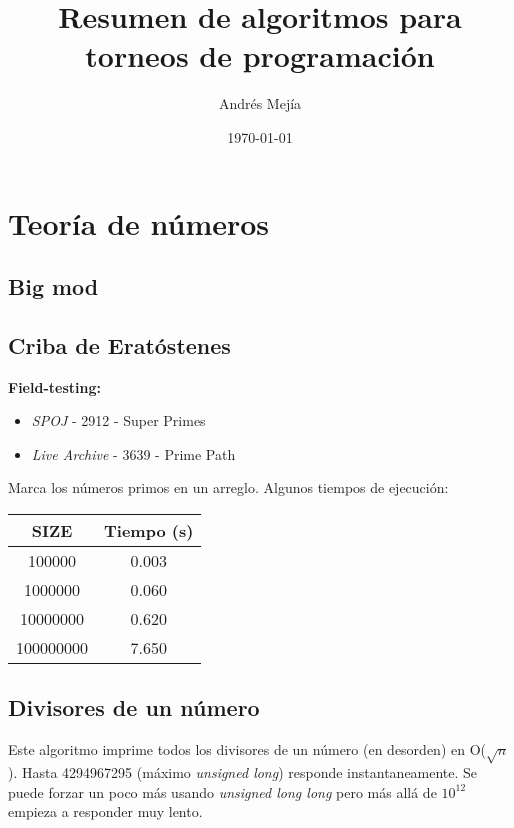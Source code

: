 \documentclass[10pt,letterpaper]{article}
\begin{document}
\title{Resumen de algoritmos para torneos de programación}
\author{Andrés Mejía}
\date{\today}
\maketitle

\tableofcontents
{}
\section{Teoría de números}
\subsection{Big mod}

\subsection{Criba de Eratóstenes}
\small
\textbf{Field-testing:} 
\begin{itemize}
\item \emph{SPOJ} -  2912 - Super Primes
\item \emph{Live Archive} - 3639 - Prime Path
\end{itemize}

\normalsize
Marca los números primos en un arreglo. Algunos tiempos de ejecución:
\begin{center}
\begin{tabular}{c c}
\hline\hline
SIZE & Tiempo (s) \\ [0.5ex]
\hline
100000 & 0.003 \\
1000000 & 0.060 \\
10000000 & 0.620 \\
100000000 & 7.650 \\ [1ex]
\hline
\end{tabular}
\end{center}


\subsection{Divisores de un número}
Este algoritmo imprime todos los divisores de un número (en desorden) en O($\sqrt{n}$).
Hasta 4294967295 (máximo \textit{unsigned long}) responde instantaneamente. Se puede
forzar un poco más usando \textit{unsigned long long} pero más allá de $10^{12}$ empieza a
responder muy lento.
\end{document}
